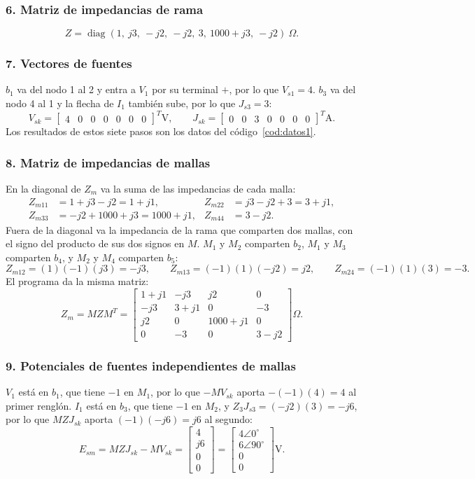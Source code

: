 \documentclass[12pt, letterpaper]{article}
\newcommand{\pol}[2]{#1\angle {#2}^{\circ}}
\newcommand{\paso}[1]{\subsubsection*{#1}}
\begin{document}
\paso{6. Matriz de impedancias de rama}

\[
Z = \operatorname{diag}\left(1,\ j3,\ -j2,\ -j2,\ 3,\ 1000+j3,\ -j2\right)\ \Omega .
\]

\paso{7. Vectores de fuentes}

$b_1$ va del nodo 1 al 2 y entra a $V_1$ por su terminal $+$, por lo que $V_{s1} = 4$. $b_3$ va del nodo 4 al 1 y
la flecha de $I_1$ también sube, por lo que $J_{s3} = 3$:
\[
V_{sk} = \begin{bmatrix} 4 & 0 & 0 & 0 & 0 & 0 & 0 \end{bmatrix}^T \text{V}, \qquad
J_{sk} = \begin{bmatrix} 0 & 0 & 3 & 0 & 0 & 0 & 0 \end{bmatrix}^T \text{A}.
\]
Los resultados de estos siete pasos son los datos del código~\ref{cod:datos1}.

\paso{8. Matriz de impedancias de mallas}

En la diagonal de $Z_m$ va la suma de las impedancias de cada malla:
\begin{align*}
Z_{m11} &= 1 + j3 - j2 = 1 + j1, & Z_{m22} &= j3 - j2 + 3 = 3 + j1, \\
Z_{m33} &= -j2 + 1000 + j3 = 1000 + j1, & Z_{m44} &= 3 - j2 .
\end{align*}
Fuera de la diagonal va la impedancia de la rama que comparten dos mallas, con el signo del producto de sus dos
signos en $M$. $M_1$ y $M_2$ comparten $b_2$, $M_1$ y $M_3$ comparten $b_4$, y $M_2$ y $M_4$ comparten $b_5$:
\[
Z_{m12} = (1)(-1)(j3) = -j3, \qquad
Z_{m13} = (-1)(1)(-j2) = j2, \qquad
Z_{m24} = (-1)(1)(3) = -3 .
\]
El programa da la misma matriz:
\[
Z_m = M Z M^T = \begin{bmatrix}
 1 + j1 & -j3    & j2       & 0 \\
 -j3    & 3 + j1 & 0        & -3 \\
 j2     & 0      & 1000 + j1 & 0 \\
 0      & -3     & 0        & 3 - j2
\end{bmatrix} \Omega .
\]

\paso{9. Potenciales de fuentes independientes de mallas}

$V_1$ está en $b_1$, que tiene $-1$ en $M_1$, por lo que $-M V_{sk}$ aporta $-(-1)(4) = 4$ al primer renglón. $I_1$
está en $b_3$, que tiene $-1$ en $M_2$, y $Z_3 J_{s3} = (-j2)(3) = -j6$, por lo que $M Z J_{sk}$ aporta
$(-1)(-j6) = j6$ al segundo:
\[
E_{sm} = M Z J_{sk} - M V_{sk} =
\begin{bmatrix} 4 \\ j6 \\ 0 \\ 0 \end{bmatrix} =
\begin{bmatrix} \pol{4}{0} \\ \pol{6}{90} \\ 0 \\ 0 \end{bmatrix} \text{V}.
\]
\end{document}
